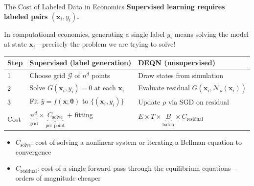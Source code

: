 \documentclass[aspectratio=169,11pt]{beamer}
\newcommand{\emphc}[1]{\textcolor{harvardcrimson}{#1}}
\newcommand{\x}{\bm{x}}
\begin{document}
\begin{frame}{The Cost of Labeled Data in Economics}
\textbf{Supervised learning requires labeled pairs $(\x_i, y_i)$.}

\vspace{0.3em}
In computational economics, generating a single label $y_i$ means \emphc{solving the model} at state $\x_i$---precisely the problem we are trying to solve!

\vspace{0.4em}
\begin{center}
\renewcommand{\arraystretch}{1.35}
{\small
\begin{tabular}{@{}lll@{}}
\toprule
\textbf{Step} & \textbf{Supervised (label generation)} & \textbf{DEQN (unsupervised)} \\
\midrule
1 & Choose grid $\mathcal{G}$ of $n^d$ points & Draw states from simulation \\
2 & \emphc{Solve} $G(\x_i, y_i) = 0$ at each $\x_i$ & Evaluate residual $G(\x_i, \mathcal{N}_\rho(\x_i))$ \\
3 & Fit $\hat{y} = f(\x; \bm{\theta})$ to $\{(\x_i, y_i)\}$ & Update $\rho$ via SGD on residual \\
\midrule
Cost & $\underbrace{n^d}_{\text{grid}} \times \underbrace{C_{\text{solve}}}_{\text{per point}}$ + fitting & $E \times T \times \underbrace{B}_{\text{batch}} \times C_{\text{residual}}$ \\
\bottomrule
\end{tabular}
}
\end{center}

\vspace{0.4em}
{\small
\begin{itemize}
    \item $C_{\text{solve}}$: cost of solving a nonlinear system or iterating a Bellman equation to convergence
    \item $C_{\text{residual}}$: cost of a single forward pass through the equilibrium equations---\emphc{orders of magnitude cheaper}
\end{itemize}
}
\end{frame}
\end{document}
